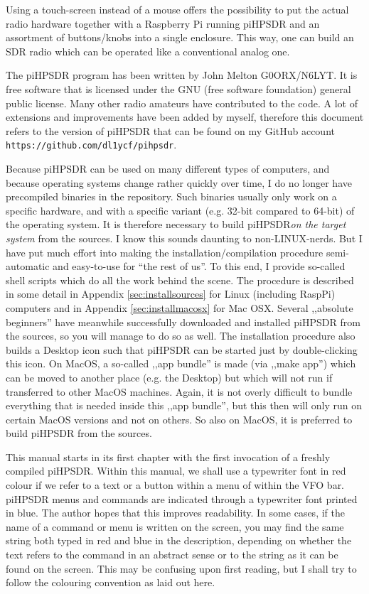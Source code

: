 \documentclass[12pt]{book}
\def\pH{pi\-HPSDR\xspace}
\begin{document}
Using a touch-screen instead of a mouse offers the possibility to put the actual radio hardware together
with a Raspberry Pi running \pH and an assortment of buttons/knobs into a single enclosure. This way,
one can build an SDR radio which can be operated like a conventional analog one.

The \pH program has been written by John Melton G0ORX/N6LYT. It is free software that is licensed under
the GNU (free software foundation) general public license. Many other radio amateurs have contributed to
the code. A lot of extensions and improvements have been added by myself, therefore this document refers
to the version of \pH that can be found on my GitHub account \texttt{https://github.com/dl1ycf/pihpsdr}.

Because \pH can be used on many different types of computers, and because operating systems change
rather quickly over time, I do no longer have precompiled binaries in the repository. Such binaries
usually only work on a specific hardware, and with a specific variant (e.g. 32-bit compared to 64-bit) of
the operating system. It is therefore necessary to build \pH \textit{on the target system}
from the sources. I know this sounds daunting to non-LINUX-nerds. But I have put much effort into making
the installation/compilation procedure semi-automatic and easy-to-use for ``the rest of us''.
To this end, I provide so-called shell scripts which do all the work behind the scene.
The procedure is described in some detail in Appendix \ref{sec:installsources} for Linux (including RaspPi)
computers and in Appendix \ref{sec:installmacosx} for Mac OSX. Several ,,absolute beginners'' have meanwhile
successfully downloaded and installed \pH from the sources, so you will manage to do so as well.
The installation procedure also builds a Desktop icon such that \pH can be started just by double-clicking
this icon.
On MacOS,
a so-called ,,app bundle'' is made (via ,,make app'') which can be moved to another place (e.g. the Desktop)
but which will not run if transferred to other MacOS machines. Again, it is not overly difficult
to bundle everything that is needed inside this ,,app bundle'', but this then will only run on certain
MacOS versions and not on others. So also on MacOS, it is preferred to build \pH from the sources.

This manual starts in its first chapter with the first invocation of a freshly compiled \pH.
Within this manual, we shall use a typewriter font in red colour if we refer to a text or a button within
a menu of within the VFO bar. \pH menus and commands are indicated through a typewriter font
printed in blue. The author hopes that this improves readability. In some cases, if the name of a command
or  menu is written on the screen, you may find the same string both typed in red and blue in the
description, depending on whether the text refers to the command in an abstract sense or to the string as it
can be found on the screen. This may be confusing upon first reading, but I shall try to follow the colouring
convention as laid out here.
\end{document}
